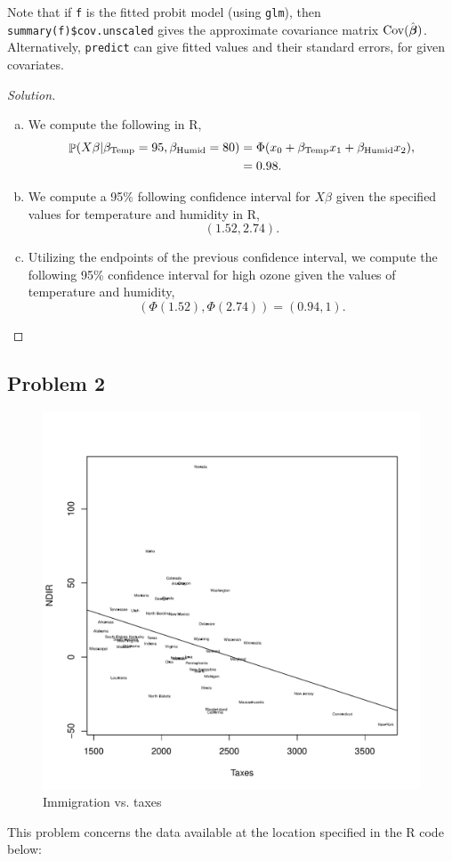\documentclass{amsart}\usepackage[]{graphicx}\usepackage[]{color}
\newenvironment{knitrout}{}{} %
\DeclareMathOperator{\cov}{\rm Cov}
\DeclareMathOperator{\Prob}{\mathbb{P}}
\newcommand{\bvec}[1]{{\boldsymbol #1}}
\begin{document}
		Note that if \verb|f| is the fitted probit model (using \verb|glm|), then \verb|summary(f)$cov.unscaled| gives the approximate covariance matrix $\cov(\hat{\bvec{\beta}})$.
		Alternatively, \verb|predict| can give fitted values and their standard errors, for given covariates.
		\begin{proof}[Solution] \

			\begin{enumerate}[(a)]
				\item We compute the following in R,
				    \begin{align*}
				        \Prob(X\beta | \beta_{\rm Temp} = 95, \beta_{\rm Humid} = 80) &= \Phi(x_{0} + \beta_{\rm Temp}x_{1} + \beta_{\rm Humid}x_{2}), \\
				        &= 0.98.
				    \end{align*}
				\item We compute a 95\% following confidence interval for $X\beta$ given the specified values for temperature and humidity in R, $$\left( 1.52, 2.74 \right).$$
				\item Utilizing the endpoints of the previous confidence interval, we compute the following 95\% confidence interval for high ozone given the values of temperature and humidity, $$ \left( \Phi(1.52), \Phi(2.74) \right) = \left( 0.94, 1 \right).$$
			\end{enumerate}
		\end{proof}
		\newpage

		\subsection{Problem 2} %
		\label{sub:problem_2}

        \begin{figure}[h]
\begin{knitrout}
\color{fgcolor}
\includegraphics[width=.7\linewidth]{figure/2_Fig1-1} 

\end{knitrout}
        \caption{Immigration vs. taxes}
        \end{figure}
		This problem concerns the data available at the location specified in the R code below:
\end{document}

